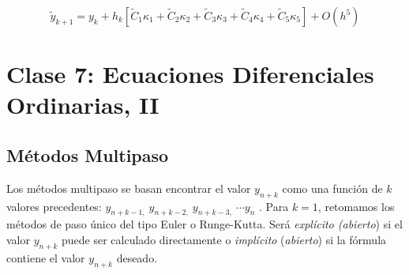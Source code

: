 \documentclass[spanish,titlepage,11pt]{article}
\begin{document}
\[
\tilde{y}_{k+1}=y_{k}+h_{k}\left[  \tilde{C}_{1}\kappa_{1}+\tilde{C}_{2}%
\kappa_{2}+\tilde{C}_{3}\kappa_{3}+\tilde{C}_{4}\kappa_{4}+\tilde{C}_{5}%
\kappa_{5}\right]  +O(h^{5})
\]

\newpage

\section{\textbf{Clase 7: Ecuaciones Diferenciales Ordinarias, II}}

\subsection{M\'{e}todos Multipaso}

Los m\'{e}todos multipaso se basan encontrar el valor $y_{n+k}$ como una
funci\'{o}n de $k$ valores precedentes: $y_{n+k-1,}\ y_{n+k-2,}\ y_{n+k-3,}%
\ \cdots y_{n}$ . Para $k=1$, retomamos los m\'{e}todos de paso \'{u}nico del
tipo Euler o Runge-Kutta. Ser\'{a} \textit{expl\'{i}cito (abierto}) si el
valor $y_{n+k}$ puede ser calculado directamente o \textit{impl\'{i}cito}
(\textit{abierto}) si la f\'{o}rmula contiene el valor $y_{n+k}$ deseado.
\end{document}

